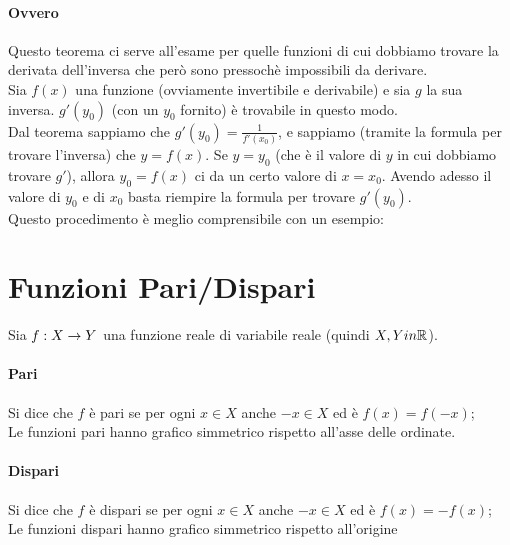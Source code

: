 \documentclass[12pt, a4paper, openany]{book}
\begin{document}
\paragraph*{Ovvero} Questo teorema ci serve all'esame per quelle funzioni di cui dobbiamo trovare la derivata dell'inversa che però sono pressochè impossibili da derivare.
\\Sia $f(x)$ una funzione (ovviamente invertibile e derivabile) e sia $g$ la sua inversa. 
$g'(y_0)$ (con un $y_0$ fornito) è trovabile in questo modo.
\\Dal teorema sappiamo che $g'(y_0) = \frac{1}{f'(x_0)}$, e sappiamo (tramite la formula per trovare l'inversa) che
$y=f(x)$. Se $y=y_0$ (che è il valore di $y$ in cui dobbiamo trovare $g'$), allora $y_0= f(x)$ ci da un certo valore di $x=x_0$.
Avendo adesso il valore di $y_0$ e di $x_0$ basta riempire la formula per trovare $g'(y_0)$.
\\Questo procedimento è meglio comprensibile con un esempio:
\section*{Funzioni Pari/Dispari}
Sia $f: X \rightarrow Y$ una funzione reale di variabile reale (quindi $X, Y in \mathbb{R}$).
\paragraph*{Pari}
Si dice che $f$ è pari se per ogni $x \in X$ anche $-x \in X$ ed è $f(x) = f(-x)$;
\\Le funzioni pari hanno grafico simmetrico rispetto all'asse delle ordinate.
\paragraph*{Dispari}
Si dice che $f$ è dispari se per ogni $x \in X$ anche $-x \in X$ ed è $f(x) = -f(x)$;
\\Le funzioni dispari hanno grafico simmetrico rispetto all'origine
\end{document}
